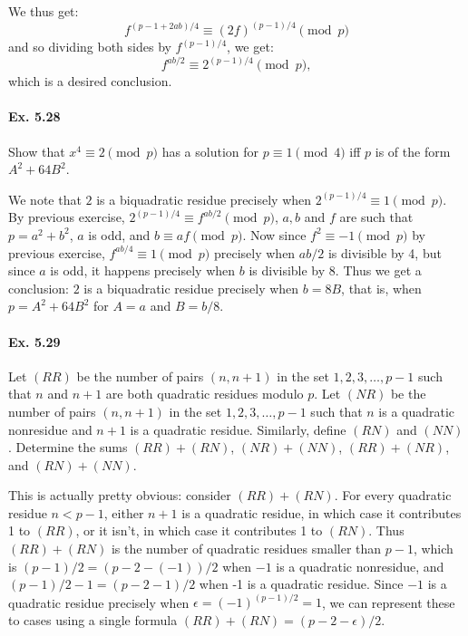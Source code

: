 \documentclass[notitlepage]{article}
\theoremstyle{definition}
\begin{document}
We thus get:
\begin{equation}
  f^{(p-1 + 2ab)/4} \equiv (2f)^{(p-1)/4} \pmod p
\end{equation}
and so dividing both sides by $f^{(p-1)/4}$, we get:
\begin{equation}
  f^{ab/2} \equiv 2^{(p-1)/4} \pmod p,
\end{equation}
which is a desired conclusion.

\paragraph{Ex. 5.28}
Show that $x^4 \equiv 2 \pmod p$ has a solution for $p \equiv 1 \pmod
4$ iff $p$ is of the form $A^2 + 64B^2$.

We note that $2$ is a biquadratic residue precisely when $2^{(p-1)/4}
\equiv 1 \pmod p$. By previous exercise, $2^{(p-1)/4} \equiv f^{ab/2}
\pmod p$, $a, b$ and $f$ are such that $p = a^2 + b^2$, $a$ is odd,
and $b \equiv af \pmod p$. Now since $f^2 \equiv -1 \pmod p$ by
previous exercise, $f^{ab/4} \equiv 1 \pmod p$ precisely when $ab/2$
is divisible by 4, but since $a$ is odd, it happens precisely when $b$
is divisible by $8$. Thus we get a conclusion: $2$ is a biquadratic
residue precisely when $b = 8B$, that is, when $p = A^2 + 64B^2$ for
$A = a$ and $B = b/8$.

\paragraph{Ex. 5.29}
Let $(RR)$ be the number of pairs $(n, n + 1)$ in the set $1,2,3,
\ldots, p - 1$ such that $n$ and $n + 1$ are both quadratic residues
modulo $p$. Let $(NR)$ be the number of pairs $(n, n + 1)$ in the set
$1,2,3, \ldots, p - 1$ such that $n$ is a quadratic nonresidue and $n
+ 1$ is a quadratic residue. Similarly, define $(RN)$ and
$(NN)$. Determine the sums $(RR) + (RN)$, $(NR) + (NN)$, $(RR) +
(NR)$, and $(RN) + (NN)$.

This is actually pretty obvious: consider $(RR) + (RN)$. For every
quadratic residue $n < p-1$, either $n+1$ is a quadratic residue, in
which case it contributes 1 to $(RR)$, or it isn't, in which case it
contributes 1 to $(RN)$. Thus $(RR)+(RN)$ is the number of quadratic
residues smaller than $p-1$, which is $(p-1)/2 = (p-2-(-1))/2$ when
$-1$ is a quadratic nonresidue, and $(p-1)/2-1 = (p-2-1)/2$ when -1 is
a quadratic residue. Since $-1$ is a quadratic residue precisely when
$\epsilon = (-1)^{(p-1)/2} = 1$, we can represent these to cases using
a single formula $(RR) + (RN) = (p-2-\epsilon)/2$.
\end{document}
